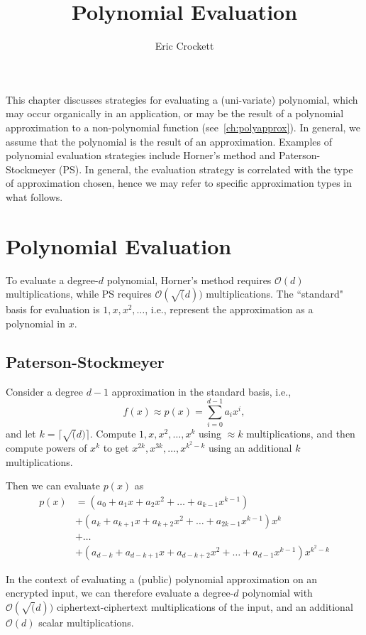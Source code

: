 \documentclass[../fheimpl.tex]{subfiles}
\title{Polynomial Evaluation}
\author{Eric Crockett}
\begin{document}
	\ifcompileasbook
	\else
	\maketitle
	\listoffixmes
	\fi
	
	This chapter discusses strategies for evaluating a (uni-variate) polynomial, which may occur organically in an application, or may be the result of a polynomial approximation to a non-polynomial function (see~\cref{ch:polyapprox}). In general, we assume that the polynomial is the result of an approximation. Examples of polynomial evaluation strategies include Horner's method and Paterson-Stockmeyer (PS). 
	In general, the evaluation strategy is correlated with the type of approximation chosen, hence we may refer to specific approximation types in what follows.
	
	
	\section{Polynomial Evaluation}
	To evaluate a degree-$d$ polynomial, Horner's method requires $\mathcal{O}(d)$ multiplications, while PS requires $\mathcal{O}(\sqrt(d))$ multiplications. The ``standard" basis for evaluation is ${1, x, x^2, \ldots}$, i.e., represent the approximation as a polynomial in $x$.
	
	\subsection{Paterson-Stockmeyer}
	Consider a degree $d-1$ approximation in the standard basis, i.e.,
	\[f(x)\approx p(x) = \sum_{i=0}^{d-1} a_ix^i,\] 
	and let $k=\lceil\sqrt(d)\rceil$. Compute $1, x, x^2, \ldots, x^{k}$ using $\approx k$ multiplications, and then compute powers of $x^k$ to get $x^{2k}, x^{3k}, \ldots, x^{k^2-k}$ using an additional $k$ multiplications.
	
	Then we can evaluate $p(x)$ as
	\begin{align*}
		p(x) & = (a_0 + a_1x + a_2x^2 + \ldots + a_{k-1}x^{k-1}) \\
		& + (a_k + a_{k+1}x + a_{k+2}x^2 + \ldots + a_{2k-1}x^{k-1})x^k \\
		& + \ldots \\
		& + (a_{d-k} + a_{d-k+1}x + a_{d-k+2}x^2 + \ldots + a_{d-1}x^{k-1})x^{k^2-k}
	\end{align*}
	
	In the context of evaluating a (public) polynomial approximation on an encrypted input, we can therefore evaluate a degree-$d$ polynomial with $\mathcal{O}(\sqrt(d))$ ciphertext-ciphertext multiplications of the input, and an additional $\mathcal{O}(d)$  scalar multiplications.
	
\end{document}
